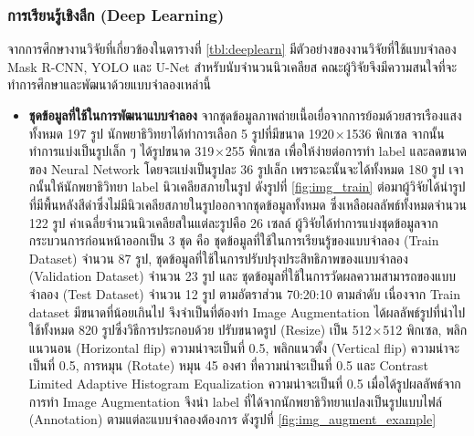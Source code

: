 \documentclass[12pt,oneside,openright,a4paper]{cpe-thai-project}
\begin{document}
\subsubsection{การเรียนรู้เชิงลึก (Deep Learning)}
จากการศึกษางานวิจัยที่เกี่ยวข้องในตารางที่ \ref{tbl:deeplearn} มีตัวอย่างของงานวิจัยที่ใช้แบบจำลอง Mask R-CNN, YOLO และ U-Net สำหรับนับจำนวนนิวเคลียส คณะผู้วิจัยจึงมีความสนใจที่จะทำการศึกษาและพัฒนาด้วยแบบจำลองเหล่านี้
\begin{itemize}[listparindent=\parindent]
\item \textbf{ชุดข้อมูลที่ใช้ในการพัฒนาแบบจำลอง} 
จากชุดข้อมูลภาพถ่ายเนื้อเยื่อจากการย้อมด้วยสารเรืองแสงทั้งหมด 197 รูป นักพยาธิวิทยาได้ทำการเลือก 5 รูปที่มีขนาด 1920 × 1536 พิกเซล จากนั้นทำการแบ่งเป็นรูปเล็ก ๆ ได้รูปขนาด 319 × 255 พิกเซล เพื่อให้ง่ายต่อการทำ label และลดขนาดของ Neural Network โดยจะแบ่งเป็นรูปละ 36 รูปเล็ก เพราะฉะนั้นจะได้ทั้งหมด 180 รูป เจากนั้นให้นักพยาธิวิทยา label นิวเคลียสภายในรูป ดังรูปที่ \ref{fig:img_train} ต่อมาผู้วิจัยได้นำรูปที่มีพื้นหลังสีดำซึ่งไม่มีนิวเคลียสภายในรูปออกจากชุดข้อมูลทั้งหมด ซึ่งเหลือผลลัพธ์ทั้งหมดจำนวน 122 รูป ค่าเฉลี่ยจำนวนนิวเคลียสในแต่ละรูปคือ 26 เซลล์ ผู้วิจัยได้ทำการแบ่งชุดข้อมูลจากกระบวนการก่อนหน้าออกเป็น 3 ชุด คือ ชุดข้อมูลที่ใช้ในการเรียนรู้ของแบบจำลอง (Train Dataset) จำนวน 87 รูป, ชุดข้อมูลที่ใช้ในการปรับปรุงประสิทธิภาพของแบบจำลอง (Validation Dataset) จำนวน 23 รูป และ ชุดข้อมูลที่ใช้ในการวัดผลความสามารถของแบบจำลอง (Test Dataset) จำนวน 12 รูป ตามอัตราส่วน 70:20:10 ตามลำดับ เนื่องจาก Train dataset มีขนาดที่น้อยเกินไป จึงจำเป็นที่ต้องทำ Image Augmentation ได้ผลลัพธ์รูปที่นำไปใช้ทั้งหมด 820 รูปซึ่งวิธีการประกอบด้วย ปรับขนาดรูป (Resize) เป็น 512 × 512 พิกเซล, พลิกแนวนอน (Horizontal flip) ความน่าจะเป็นที่ 0.5, พลิกแนวตั้ง (Vertical flip) ความน่าจะเป็นที่ 0.5, การหมุน (Rotate) หมุน 45 องศา ที่ความน่าจะเป็นที่ 0.5 และ Contrast Limited Adaptive Histogram Equalization ความน่าจะเป็นที่ 0.5 เมื่อได้รูปผลลัพธ์จากการทำ Image Augmentation จึงนำ label ที่ได้จากนักพยาธิวิทยาแปลงเป็นรูปแบบไฟล์ (Annotation) ตามแต่ละแบบจำลองต้องการ ดังรูปที่ \ref{fig:img_augment_example}


\end{itemize}
\end{document}

